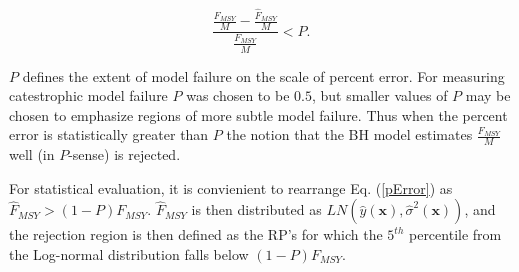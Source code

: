 %
\begin{equation}
\frac{\frac{F_{MSY}}{M}-\frac{\hat{F}_{MSY}}{M}}{\frac{F_{MSY}}{M}}<P. \label{pError}
\end{equation}

%
$P$ defines the extent of model failure on the scale of percent error. For 
measuring catestrophic model failure $P$ was chosen to be $0.5$, but smaller values 
of $P$ may be chosen to emphasize regions of more subtle model failure. %
%
Thus when the percent error is statistically greater than $P$ the notion that 
the BH model estimates $\frac{F_{MSY}}{M}$ well (in $P$-sense) is rejected.

%
For statistical evaluation, it is convienient to rearrange Eq. (\ref{pError}) 
as \mbox{$\hat{F}_{MSY}>(1-P)F_{MSY}$}. $\hat{F}_{MSY}$ is then distributed as $LN(\hat y(\textbf{x}), \hat \sigma^2(\textbf{x}))$, 
and the rejection region is then defined as the RP's for which the $5^{th}$ percentile 
from the Log-normal distribution falls below \mbox{$(1-P)F_{MSY}$.}


